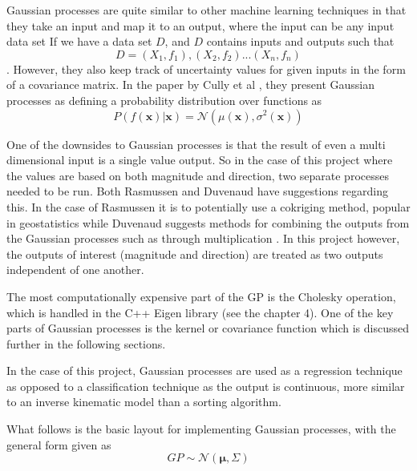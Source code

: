 \documentclass[12pt]{report}
\begin{document}
Gaussian processes are quite similar to other machine learning techniques in that they take an input and map it to an output, where the input can be any input data set If we have a data set $D$, and $D$ contains inputs and outputs such that $$D = {(X_1,f_1),(X_2,f_2)...(X_n,f_n)}$$. However, they also keep track of uncertainty values for given inputs in the form of a covariance matrix. In the paper by Cully et al \cite{Cully15}, they present Gaussian processes as defining a probability distribution over functions as
\begin{equation}
	P(f(\boldsymbol{x})|\boldsymbol{x})=\mathcal{N}(\mu(\boldsymbol{x}),\sigma^2(\boldsymbol{x}))
	\label{eq:distribution for GP}
\end{equation} 

One of the downsides to Gaussian processes is that the result of even a multi dimensional input is a single value output. So in the case of this project where the values are based on both magnitude and direction, two separate processes needed to be run. Both Rasmussen and Duvenaud have suggestions regarding this. In the case of Rasmussen it is to potentially use a cokriging method, popular in geostatistics while Duvenaud suggests methods for combining the outputs from the Gaussian processes such as through multiplication \cite{Rasmussen06, Duvenaud14}. In this project however, the outputs of interest (magnitude and direction) are treated as two outputs independent of one another. 

The most computationally expensive part of the GP is the Cholesky operation, which is handled in the C++ Eigen library (see the chapter 4). One of the key parts of Gaussian processes is the kernel or covariance function which is discussed further in the following sections.

In the case of this project, Gaussian processes are used as a regression technique as opposed to a classification technique as the output is continuous, more similar to an inverse kinematic model than a sorting algorithm.

What follows is the basic layout for implementing Gaussian processes, with the general form given as 
\begin{equation}
	GP\sim\mathcal{N}(\boldsymbol{\mu},\Sigma)
	\label{eq:GP_general form}
\end{equation}
\end{document}
